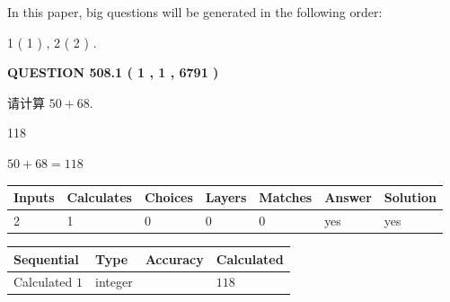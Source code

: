 \documentclass{ctexart}
\begin{document}
In this paper, big questions will be generated in the following order: 
   
   
   1 ( 1 )
 ,
   2 ( 2 )
 .
  
\vspace{0.2in}
  
{\textbf{\Large{QUESTION
508.1 
 ( 1 , 1 , 6791 )
}}}
  
  
 
请计算 $ %
50 +  %
68 $.
 
 
 
\noindent{}
 
 

118
 
 
\noindent{}
 
 

 
 
 
\noindent{}
 
 

$ %
50 +  %
68=   %
118$
 
 
\noindent{}
 
 

 
   
   
   
   
\noindent\begin{tabular}{|l|l|l|l|l|l|l|}
 \hline
Inputs & Calculates & Choices & Layers & Matches & Answer & Solution \\ \hline
 2  & 
 1  & 
 0
  & 
 0  & 
 0  & 
  yes & 
  yes 
  \\ \hline
 \end{tabular}
   
   
   
   
\noindent{}
   
   
  
  
\noindent\begin{tabular}{|l|l|l|l|}
\hline
 Sequential & Type & Accuracy & Calculated \\ 
\hline
 
 
  Calculated $  1 $ & integer &  & 
  $ 118 $ 
 \\  \hline  
 \end{tabular}
   
\end{document}
